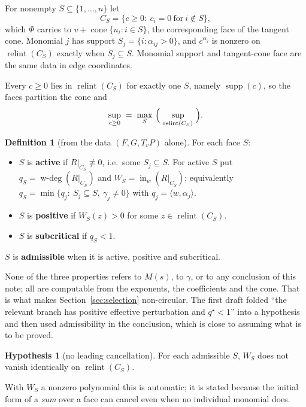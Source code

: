 \documentclass[11pt]{article}
\theoremstyle{definition}
\newtheorem{hypothesis}{Hypothesis}
\newtheorem{definition}{Definition}
\theoremstyle{remark}
\DeclareMathOperator{\cone}{cone}
\DeclareMathOperator{\relint}{relint}
\DeclareMathOperator{\supp}{supp}
\DeclareMathOperator*{\wdeg}{w\text{-}deg}
\newcommand{\inw}{\operatorname{in}_w}
\begin{document}
For nonempty $S\subseteq\{1,\dots,n\}$ let
\[
  C_S=\{c\ge0:\ c_i=0\ \text{for}\ i\notin S\},
\]
which $\Phi$ carries to $v+\cone\{u_i:i\in S\}$, the corresponding face of the
tangent cone. Monomial $j$ has support $S_j=\{i:\alpha_{ij}>0\}$, and
$c^{\alpha_j}$ is nonzero on $\relint(C_S)$ exactly when $S_j\subseteq S$.
Monomial support and tangent-cone face are the same data in edge coordinates.

Every $c\ge0$ lies in $\relint(C_S)$ for exactly one $S$, namely $\supp(c)$,
so the faces partition the cone and
\begin{equation}\label{eq:partition}
  \sup_{c\ge0}\;=\;\max_{S}\ \Bigl(\ \sup_{\relint(C_S)}\ \Bigr).
\end{equation}

\begin{definition}[from the data $(F,G,T_vP)$ alone]\label{def:adm}
For each face $S$:
\begin{itemize}[nosep]
  \item $S$ is \textbf{active} if $R|_{C_S}\not\equiv0$, i.e.\ some
        $S_j\subseteq S$. For active $S$ put $q_S=\wdeg(R|_{C_S})$ and
        $W_S=\inw(R|_{C_S})$; equivalently
        $q_S=\min\{q_j:\ S_j\subseteq S,\ \gamma_j\ne0\}$ with
        $q_j=\langle w,\alpha_j\rangle$.
  \item $S$ is \textbf{positive} if $W_S(z)>0$ for some $z\in\relint(C_S)$.
  \item $S$ is \textbf{subcritical} if $q_S<1$.
\end{itemize}
$S$ is \textbf{admissible} when it is active, positive and subcritical.
\end{definition}

None of the three properties refers to $M(s)$, to $\gamma$, or to any
conclusion of this note; all are computable from the exponents, the
coefficients and the cone. That is what makes Section~\ref{sec:selection}
non-circular. The first draft folded ``the relevant branch has positive
effective perturbation and $q^\star<1$'' into a hypothesis and then used
admissibility in the conclusion, which is close to assuming what is to be
proved.

\begin{hypothesis}[no leading cancellation]\label{hyp:nocancel}
For each admissible $S$, $W_S$ does not vanish identically on $\relint(C_S)$.
\end{hypothesis}

With $W_S$ a nonzero polynomial this is automatic; it is stated because the
initial form of a \emph{sum} over a face can cancel even when no individual
monomial does.
\end{document}
